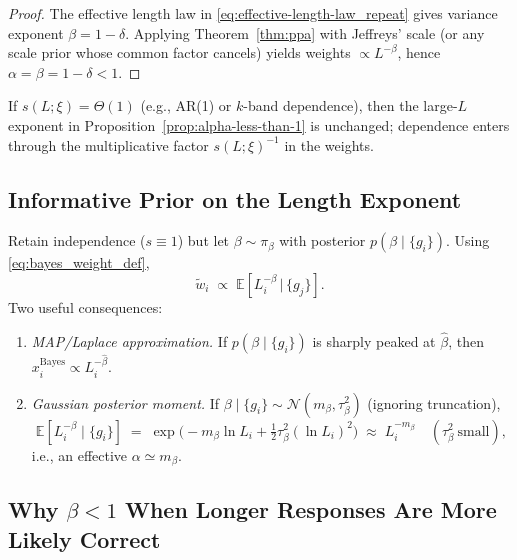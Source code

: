 \begin{proof}
The effective length law in \eqref{eq:effective-length-law_repeat} gives variance exponent $\beta=1-\delta$. Applying Theorem~\ref{thm:ppa} with Jeffreys’ scale (or any scale prior whose common factor cancels) yields weights $\propto L^{-\beta}$, hence $\alpha=\beta=1-\delta<1$.
\end{proof}

\begin{corollary}\label{cor:dependence}
If $s(L;\xi)=\Theta(1)$ (e.g., AR(1) or $k$-band dependence), then the large-$L$ exponent in Proposition~\ref{prop:alpha-less-than-1} is unchanged; dependence enters through the multiplicative factor $s(L;\xi)^{-1}$ in the weights.
\end{corollary}

\subsection{Informative Prior on the Length Exponent}\label{subsec:informative-beta}
Retain independence ($s\equiv 1$) but let $\beta\sim\pi_\beta$ with posterior $p(\beta\mid\{g_i\})$. Using \eqref{eq:bayes_weight_def},
\begin{equation}
  \widetilde{w}_i \;\propto\; \mathbb{E}\!\left[L_i^{-\beta}\,\big|\,\{g_j\}\right].
  \label{eq:wtilde_beta_random_repeat}
\end{equation}
Two useful consequences:
\begin{enumerate}
  \item \emph{MAP/Laplace approximation.} If $p(\beta\mid\{g_i\})$ is sharply peaked at $\hat\beta$, then
  \(
    x_i^{\mathrm{Bayes}} \propto L_i^{-\hat\beta}.
  \)
  \item \emph{Gaussian posterior moment.} If $\beta\mid\{g_i\}\sim \mathcal{N}(m_\beta,\tau_\beta^2)$ (ignoring truncation),
  \begin{equation}
    \mathbb{E}\!\left[L_i^{-\beta}\mid\{g_i\}\right]
    \;=\;
    \exp\!\Big(-m_\beta\ln L_i + \tfrac{1}{2}\tau_\beta^2(\ln L_i)^2\Big)
    \;\approx\; L_i^{-m_\beta}\quad (\tau_\beta^2\ \text{small}),
  \end{equation}
  i.e., an effective $\alpha\simeq m_\beta$.
\end{enumerate}

\subsection{Why \texorpdfstring{$\beta<1$}{beta < 1} When Longer Responses Are More Likely Correct}\label{subsec:alpha-less-than-1}
